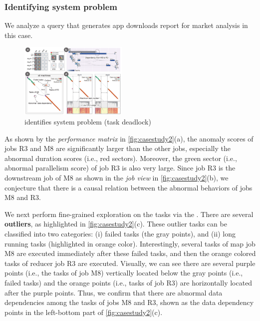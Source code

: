 \subsubsection{Identifying system problem}
We analyze a query that generates app downloads report for market analysis in this case.
\begin{figure}
	\centering
	\small
	\includegraphics[width=0.46\textwidth]{figures/case_study/CaseStudy2SDS.pdf}  
	\vspace{-3mm}
	\caption{\qevis{} identifies system problem (task deadlock)} 
	\label{fig:casestudy2}
	\vspace{-5mm}
\end{figure}

As shown by the \textit{performance matrix} in \autoref{fig:casestudy2}(a), the anomaly scores of jobs R3 and M8 are significantly larger than the other jobs, especially the abnormal duration scores (i.e., red sectors). 
Moreover, the green sector (i.e., abnormal parallelism score) of job R3 is also very large.
Since job R3 is the downstream job of M8 as shown in the \textit{job view} in \autoref{fig:casestudy2}(b), 
we conjecture that there is a causal relation between the abnormal behaviors of jobs M8 and R3.


We next perform fine-grained exploration on the tasks via the .
There are several \textbf{outliers}, as highlighted in \autoref{fig:casestudy2}(c).
These outlier tasks can be classified into two categories: (i) failed tasks (the gray points), and (ii) long running tasks (highlighted in orange color).
Interestingly, several tasks of map job M8 are executed immediately after these failed tasks, and then the orange colored tasks of reducer job R3 are executed.
Visually, we can see there are several purple points (i.e., the tasks of job M8) vertically located below the gray points (i.e., failed tasks) and the orange points (i.e., tasks of job R3) are horizontally located after the purple points.
Thus, we confirm that there are abnormal data dependencies among the tasks of jobs M8 and R3, shown as the data dependency points in the left-bottom part of \autoref{fig:casestudy2}(c).



